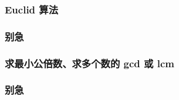 \subsubsection{Euclid 算法}
\begin{frame}[c]
  \progressnow
\end{frame}
\begin{frame} %
  \frametitle{别急}
\end{frame}
\subsubsection{求最小公倍数、求多个数的 gcd 或 lcm}
\begin{frame}[c]
  \progressnow
\end{frame}
\begin{frame} %
  \frametitle{别急}
\end{frame}
